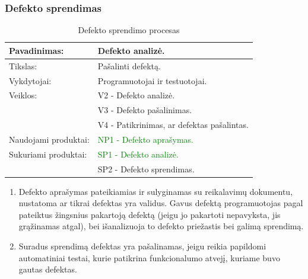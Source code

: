 \documentclass{VUMIFPSkursinis}
\begin{document}
	\subsubsection{Defekto sprendimas}
	\begin{center}
		\begin{table}[ht]
			\caption{Defekto sprendimo procesas}
			\begin{tabular}{ | l | l | }
				\hline
				Pavadinimas:		& Defekto analizė.				\\ \hline
				Tikslas:		& Pašalinti defektą.				\\ \hline
				Vykdytojai:		& Programuotojai ir testuotojai.		\\ \hline
				Veiklos:		& V2 - Defekto analizė.				\\
							& V3 - Defekto pašalinimas.			\\
							& V4 - Patikrinimas, ar defektas pašalintas.	\\ \hline

				Naudojami produktai:	& \textcolor{green}{NP1 - Defekto aprašymas.}			\\ \hline
				Sukuriami produktai:	& \textcolor{green}{SP1 - Defekto analizė.	}		\\
							& SP2 - Defekto sprendimas.			\\ \hline
			\end{tabular}
		\end{table}
	\end{center}
	\begin{enumerate}
		\item{
			Defekto aprašymas pateikiamias ir sulyginamas su reikalavimų dokumentu, nustatoma ar tikrai defektas yra validus.
			Gavus defektą programuotojas pagal pateiktus žingsnius pakartoją defektą (jeigu jo pakartoti nepavyksta, jis grąžinamas atgal), bei išanalizuoja to defekto priežastis bei galimą sprendimą.}
		\item{
			Suradus sprendimą defektas yra pašalinamas, jeigu reikia papildomi automatiniai testai, kurie patikrina funkcionalumo atvejį, kuriame buvo gautas defektas.
		}
	\end{enumerate}
\end{document}
